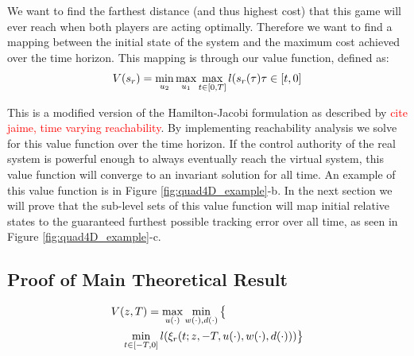  We want to find the farthest distance (and thus highest cost) that this game will ever reach when both players are acting optimally. Therefore we want to find a mapping between the initial state of the system and the maximum cost achieved over the time horizon. This mapping is through our value function, defined as:
 \begin{equation}
 	V(s_r)= \min_{u_2} \max_{u_1} \max_{t\in [0,T]} l(s_r(\tau)
 	\tau \in [t, 0]
 \end{equation} 
 
 This is a modified version of the Hamilton-Jacobi formulation as described by \textcolor{red}{cite jaime, time varying reachability}. By implementing reachability analysis we solve for this value function over the time horizon. If the control authority of the real system is powerful enough to always eventually reach the virtual system, this value function will converge to an invariant solution for all time.  An example of this value function is in Figure \ref{fig:quad4D_example}-b. In the next section we will prove that the sub-level sets of this value function will map initial relative states to the guaranteed furthest possible tracking error over all time, as seen in Figure \ref{fig:quad4D_example}-c.
 
 \subsection{Proof of Main Theoretical Result}
 
 \begin{equation}
 \begin{aligned}
& V(z, T) = \max_{u(\cdot)} \min_{w(\cdot), d(\cdot)} \big\{\\
&\quad \min_{t \in [-T, 0]} l(\xi_r(t; z, -T, u(\cdot), w(\cdot), d(\cdot)))\big\} 
 \end{aligned}
  \end{equation}
 
